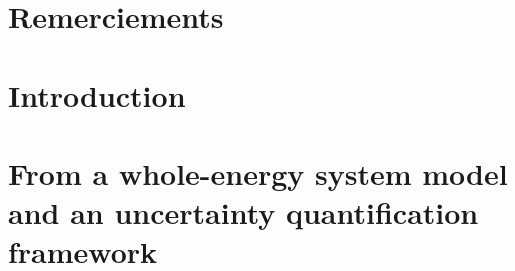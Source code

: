 \documentclass[a4paper,twoside,10pt,final]{memoir} %
\begin{document}



\frontmatter


\clearemptydoublepage


\clearemptydoublepage

\chapter*{Remerciements}

\clearemptydoublepage

\thispagestyle{empty}
\tableofcontents*
\clearemptydoublepage

\printunsrtglossaries



\mainmatter

\chapter*[Introduction]{Introduction}

\clearpage

\chapter{From a whole-energy system model and an uncertainty quantification framework}
\label{chap:chap1_ES_PCE}

\clearpage
\end{document}

